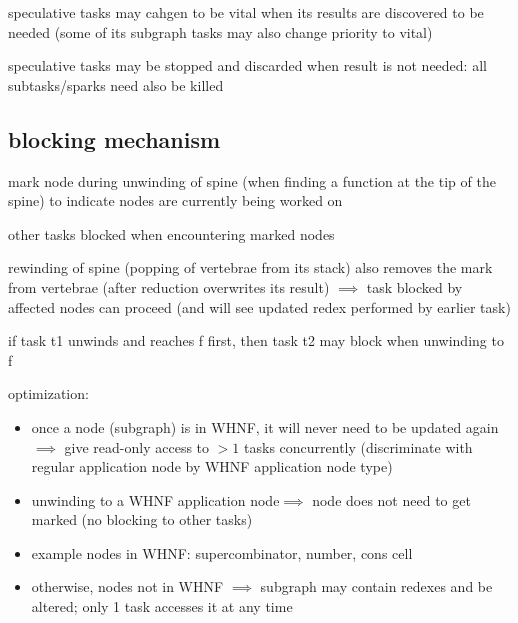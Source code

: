 \documentclass[8pt]{extarticle}
\begin{document}
\begin{multicols*}{2}
speculative tasks may cahgen to be vital when its results are discovered to be needed (some of its subgraph tasks may also change priority to vital)

speculative tasks may be stopped and discarded when result is not needed: all subtasks/sparks  need also be killed

\subsection{blocking mechanism}

mark node during unwinding of spine (when finding a function at the tip of the spine) to indicate nodes are currently being worked on

other tasks blocked when encountering marked nodes

rewinding of spine (popping of vertebrae from its stack) also removes the mark from vertebrae (after reduction overwrites its result) $\implies$ task blocked by affected nodes can proceed (and will see updated redex performed by earlier task)


if task t1 unwinds and reaches f first, then task t2 may block when unwinding to f

optimization:
\begin{itemize}
\item once a node (subgraph) is in WHNF, it will never need to be updated again $\implies$ give read-only access to $>1$ tasks concurrently (discriminate with regular application node by WHNF application node type)
\item unwinding to a WHNF application node$\implies$ node does not need to get marked (no blocking to other tasks)
\item example nodes in WHNF: supercombinator, number, cons cell
\item otherwise, nodes not in WHNF $\implies$ subgraph may contain redexes and be altered; only 1 task accesses it at any time
\end{itemize}



\end{multicols*}
\end{document}
